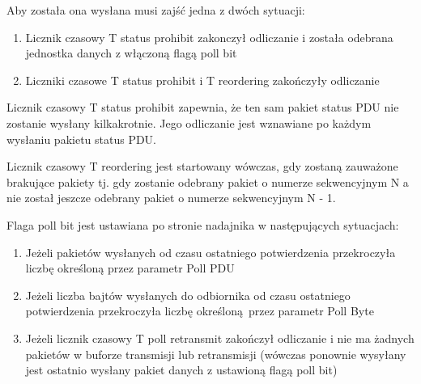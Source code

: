 Aby została ona wysłana musi zajść jedna z dwóch sytuacji:
\begin{enumerate}
	\item Licznik czasowy T status prohibit zakonczył odliczanie i została odebrana jednostka danych z włączoną flagą poll bit
	\item Liczniki czasowe T status prohibit i T reordering zakończyły odliczanie
\end{enumerate}

Licznik czasowy T status prohibit zapewnia, że ten sam pakiet status PDU nie zostanie wysłany kilkakrotnie. Jego odliczanie jest wznawiane po każdym wysłaniu pakietu status PDU.

Licznik czasowy T reordering jest startowany wówczas, gdy zostaną zauważone brakujące pakiety tj. gdy zostanie odebrany pakiet o numerze sekwencyjnym N a nie został jeszcze odebrany pakiet o numerze sekwencyjnym N - 1.

Flaga poll bit jest ustawiana po stronie nadajnika w następujących sytuacjach:
\begin{enumerate}
	\item Jeżeli pakietów wysłanych od czasu ostatniego potwierdzenia przekroczyła liczbę określoną przez parametr Poll PDU
	\item Jeżeli liczba bajtów wysłanych do odbiornika od czasu ostatniego potwierdzenia przekroczyła liczbę określoną przez parametr Poll Byte
	\item Jeżeli licznik czasowy T poll retransmit zakończył odliczanie i nie ma żadnych pakietów w buforze transmisji lub retransmisji (wówczas ponownie wysyłany jest ostatnio wysłany pakiet danych z ustawioną flagą poll bit)
\end{enumerate}


